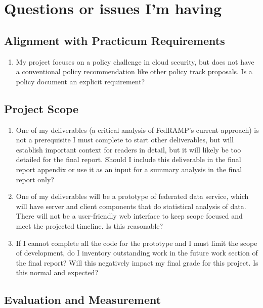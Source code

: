 \documentclass{jdf}
\begin{document}
\section*{Questions or issues I'm having}

\subsection*{Alignment with Practicum Requirements}

\begin{enumerate}
    \item My project focuses on a policy challenge in cloud security, but does not have a conventional policy recommendation like other policy track proposals. Is a policy document an explicit requirement?
\end{enumerate}

\subsection*{Project Scope}

\begin{enumerate}
    \item One of my deliverables (a critical analysis of FedRAMP's current approach) is not a prerequisite I must complete to start other deliverables, but will establish important context for readers in detail, but it will likely be too detailed for the final report. Should I include this deliverable in the final report appendix or use it as an input for a summary analysis in the final report only?
    \item One of my deliverables will be a prototype of federated data service, which will have server and client components that do statistical analysis of data. There will not be a user-friendly web interface to keep scope focused and meet the projected timeline. Is this reasonable?
    \item If I cannot complete all the code for the prototype and I must limit the scope of development, do I inventory outstanding work in the future work section of the final report? Will this negatively impact my final grade for this project. Is this normal and expected?
\end{enumerate}

\subsection*{Evaluation and Measurement}
\end{document}
